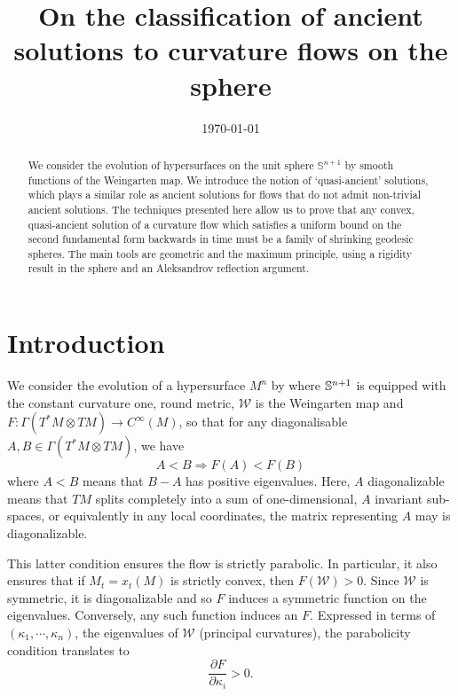 \documentclass{amsart}
\begin{document}
\title[Ancient solutions to curvature flows in the sphere]
 {On the classification of ancient solutions to curvature flows on the sphere}

\curraddr{}
\email{}
\date{\today}

\dedicatory{}
\subjclass[2010]{}
\keywords{}

\begin{abstract}
We consider the evolution of hypersurfaces on the unit sphere $\mathbb{S}^{n+1}$ by smooth functions of the Weingarten map. We introduce the notion of `quasi-ancient' solutions, which plays a similar role as ancient solutions for flows that do not admit non-trivial ancient solutions. The techniques presented here allow us to prove that any convex, quasi-ancient solution of a curvature flow which satisfies a uniform bound on the second fundamental form backwards in time must be a family of shrinking geodesic spheres. The main tools are geometric and the maximum principle, using a rigidity result in the sphere and an Aleksandrov reflection argument.
\end{abstract}

\maketitle

\section{Introduction}
\label{sec:intro}

We consider the evolution of a hypersurface $M^n$ by
\eq{\label{eq:CurvFlow}
\partial_tx=-F(\mathcal{W})\nu,~ x:M^n\times[0,T)\to \S^{n+1},
}
where \(\S^{n+1}\) is equipped with the constant curvature one, round metric, \(\mathcal{W}\) is the Weingarten map and \(F : \Gamma(T^\ast M \otimes TM) \to C^{\infty}(M)\), so that for any diagonalisable \(A, B \in \Gamma(T^\ast M \otimes TM)\), we have
\[
A < B \Rightarrow F(A) < F(B)
\]
where \(A < B\) means that \(B - A\) has positive eigenvalues. Here, \(A\) diagonalizable means that \(TM\) splits completely into a sum of one-dimensional, \(A\) invariant sub-spaces, or equivalently in any local coordinates, the matrix representing \(A\) may is diagonalizable.

This latter condition ensures the flow is strictly parabolic. In particular, it also ensures that if \(M_t = x_t(M)\) is strictly convex, then \(F(\mathcal{W}) > 0.\) Since \(\mathcal{W}\) is symmetric, it is diagonalizable and so \(F\) induces a symmetric function on the eigenvalues. Conversely, any such function induces an \(F\). Expressed in terms of \((\kappa_1,\cdots,\kappa_n)\), the eigenvalues of \(\mathcal{W}\) (principal curvatures), the parabolicity condition translates to 
\[
\frac{\partial F}{\partial \kappa_i} > 0.
\]
\end{document}
